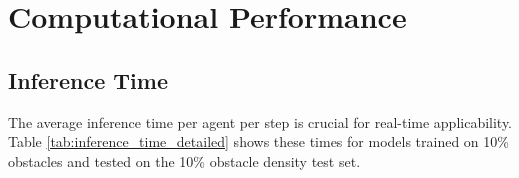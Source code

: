 \section{Computational Performance}
\label{sec:comp_perf_detailed}

\subsection{Inference Time}
\label{subsec:inference_time_detailed}
The average inference time per agent per step is crucial for real-time applicability. Table \ref{tab:inference_time_detailed} shows these times for models trained on 10\% obstacles and tested on the 10\% obstacle density test set.

